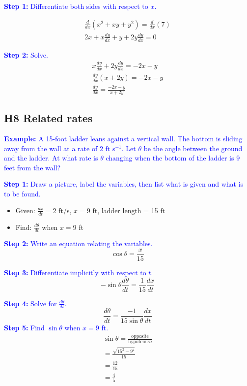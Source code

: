 \documentclass[letterpaper, 12pt]{article}
\newcommand{\example}[1]{\textcolor{blue}{\textbf{Example:} #1}}
\newcommand{\step}[2]{\textcolor{blue}{\textbf{Step #1:} #2}}
\begin{document}
\step{1}{Differentiate both sides with respect to $x$.}

\begin{gather*}
\frac{d}{dx} (x^2+xy+y^2) = \frac{d}{dx} (7) \\
2x + x \frac{dy}{dx} + y + 2y \frac{dy}{dx} = 0
\end{gather*}

\step{2}{Solve.}
\begin{gather*}
x \frac{dy}{dx} + 2y \frac{dy}{dx} = -2x - y \\
\frac{dy}{dx} (x + 2y) = -2x - y \\
\boxed{\frac{dy}{dx} = \frac{-2x - y}{x + 2y}}
\end{gather*}

\subsection*{H8 Related rates}

\example{A 15-foot ladder leans against a vertical wall. The bottom is sliding away from the wall at a rate of 2 ft s$^{-1}$. Let $\theta$ be the angle between the ground and the ladder. At what rate is $\theta$ changing when the bottom of the ladder is 9 feet from the wall?}

\step{1}{Draw a picture, label the variables, then list what is given and what is to be found.}

\begin{itemize}
\item Given: $\frac{dx}{dt} = 2$ ft/s, $x = 9$ ft, ladder length = 15 ft
\item Find: $\frac{d\theta}{dt}$ when $x = 9$ ft
\end{itemize}

\step{2}{Write an equation relating the variables.}
\[\cos \theta = \frac{x}{15}\]

\step{3}{Differentiate implicitly with respect to $t$.}
\[-\sin \theta \frac{d\theta}{dt} = \frac{1}{15} \frac{dx}{dt}\]

\step{4}{Solve for $\frac{d\theta}{dt}$.}
\[\frac{d\theta}{dt} = \frac{-1}{15 \sin \theta} \frac{dx}{dt}\]
\step{5}{Find $\sin \theta$ when $x = 9$ ft.}
\begin{gather*}
\sin \theta = \frac{\text{opposite}}{\text{hypotenuse}} \\ = \frac{\sqrt{15^2 - 9^2}}{15} \\ = \frac{12}{15} \\ = \boxed{\frac{4}{5}}
\end{gather*}
\end{document}
